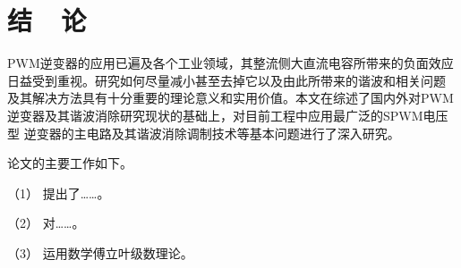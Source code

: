 
%

{}
\section*{结\ \ 论}


PWM逆变器的应用已遍及各个工业领域，其整流侧大直流电容所带来的负面效应
日益受到重视。研究如何尽量减小甚至去掉它以及由此所带来的谐波和相关问题
及其解决方法具有十分重要的理论意义和实用价值。本文在综述了国内外对PWM
逆变器及其谐波消除研究现状的基础上，对目前工程中应用最广泛的SPWM电压型
逆变器的主电路及其谐波消除调制技术等基本问题进行了深入研究。

论文的主要工作如下。

（1）	提出了……。

（2）	对……。

（3）	运用数学傅立叶级数理论。





\clearpage


%

